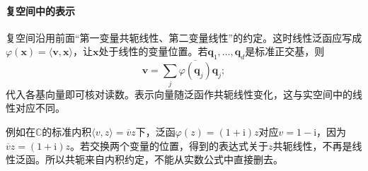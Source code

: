 \paragraph{复空间中的表示}
复空间沿用前面“第一变量共轭线性、第二变量线性”的约定。这时线性泛函应写成$\varphi(\bm x)=\langle\bm v,\bm x\rangle$，让$\bm x$处于线性的变量位置。若$\bm q_1,\ldots,\bm q_d$是标准正交基，则
\[
 \bm v=\sum_j\overline{\varphi(\bm q_j)}\bm q_j ;
\]
代入各基向量即可核对读数。表示向量随泛函作共轭线性变化，这与实空间中的线性对应不同。

例如在$\mathbb C$的标准内积$\langle v,z\rangle=\overline v z$下，泛函$\varphi(z)=(1+\mathrm i)z$对应$v=1-\mathrm i$，因为$\overline v z=(1+\mathrm i)z$。若交换两个变量的位置，得到的表达式关于$z$共轭线性，不再是线性泛函。所以共轭来自内积约定，不能从实数公式中直接删去。
